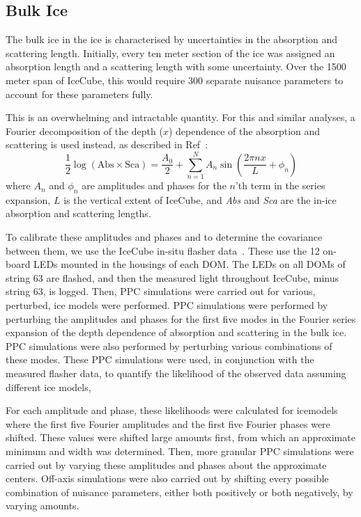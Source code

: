 \documentclass[main.tex]{subfiles}
\begin{document}
\subsection{Bulk Ice}\label{sec:bulk}

The bulk ice in the ice is characterised by uncertainties in the absorption and scattering length. 
Initially, every ten meter section of the ice was assigned an absorption length and a scattering length with some uncertainty. 
Over the 1500 meter span of IceCube, this would require 300 separate nuisance parameters to account for these parameters fully.

This is an overwhelming and intractable quantity. 
For this and similar analyses, a Fourier decomposition of the depth ($x$) dependence of the absorption and scattering is used instead, as described in Ref~\cite{Aartsen_2019_snow}: 
\begin{equation}
    \dfrac{1}{2}\log\left(\text{Abs} \times \text{Sca}\right) = \dfrac{A_{0}}{2} +\sum\limits_{n=1}^{N}A_{n} \sin\left(\dfrac{2\pi nx}{L} + \phi_{n}\right)
\end{equation}
where $A_{n}$ and $\phi_{n}$ are amplitudes and phases for the $n$'th term in the series expansion, $L$ is the vertical extent of IceCube, and \textit{Abs} and \textit{Sca} are the in-ice absorption and scattering lengths. 


To calibrate these amplitudes and phases and to determine the covariance between them, we use the IceCube in-situ flasher data~\cite{Aartsen_2013}. 
These use the 12 on-board LEDs mounted in the housings of each DOM. 
The LEDs on all DOMs of string 63 are flashed, and then the measured light throughout IceCube, minus string 63, is logged. 
Then, PPC simulations were carried out for various, perturbed, ice models were performed. 
PPC simulations were performed by perturbing the amplitudes and phases for the first five modes in the Fourier series expansion of the depth dependence of absorption and scattering in the bulk ice.
PPC simulations were also performed by perturbing various combinations of these modes. 
These PPC simulations were used, in conjunction with the measured flasher data, to quantify the likelihood of the observed data assuming different ice models,

For each amplitude and phase, these likelihoods were calculated for icemodels where the first five Fourier amplitudes and the first five Fourier phases were shifted. 
These values were shifted large amounts first, from which an approximate minimum and width was determined. 
Then, more granular PPC simulations were carried out by varying these amplitudes and phases about the approximate centers. 
Off-axis simulations were also carried out by shifting every possible combination of nuisance parameters, either both positively or both negatively, by varying amounts. 
\end{document}
